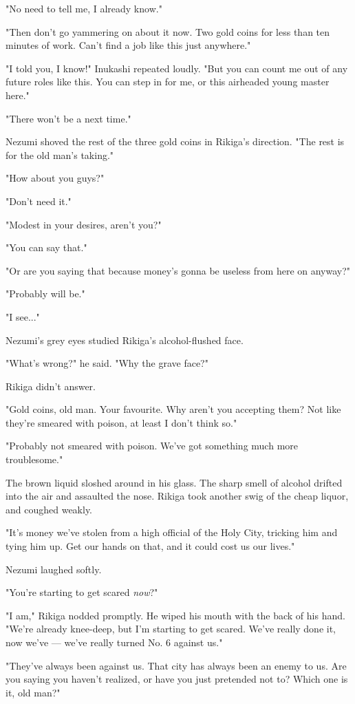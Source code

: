 "No need to tell me, I already know."

"Then don't go yammering on about it now. Two gold coins for less than
ten minutes of work. Can't find a job like this just anywhere."

"I told you, I know!" Inukashi repeated loudly. "But you can count me
out of any future roles like this. You can step in for me, or this
airheaded young master here."

"There won't be a next time."

Nezumi shoved the rest of the three gold coins in Rikiga's direction.
"The rest is for the old man's taking."

"How about you guys?"

"Don't need it."

"Modest in your desires, aren't you?"

"You can say that."

"Or are you saying that because money's gonna be useless from here on
anyway?"

"Probably will be."

"I see..."

Nezumi's grey eyes studied Rikiga's alcohol-flushed face.

"What's wrong?" he said. "Why the grave face?"

Rikiga didn't answer.

"Gold coins, old man. Your favourite. Why aren't you accepting them? Not
like they're smeared with poison, at least I don't think so."

"Probably not smeared with poison. We've got something much more
troublesome."

The brown liquid sloshed around in his glass. The sharp smell of alcohol
drifted into the air and assaulted the nose. Rikiga took another swig of
the cheap liquor, and coughed weakly.

"It's money we've stolen from a high official of the Holy City, tricking
him and tying him up. Get our hands on that, and it could cost us our
lives."

Nezumi laughed softly.

"You're starting to get scared \emph{now}?"

"I am," Rikiga nodded promptly. He wiped his mouth with the back of his
hand. "We're already knee-deep, but I'm starting to get scared. We've
really done it, now we've --- we've really turned No. 6 against us."

"They've always been against us. That city has always been an enemy to
us. Are you saying you haven't realized, or have you just pretended not
to? Which one is it, old man?"

